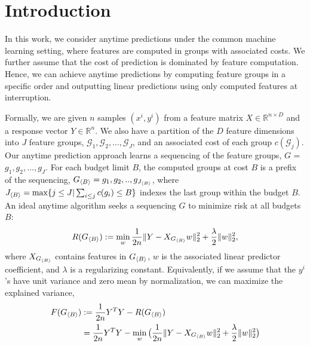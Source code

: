 \section{Introduction}


In this work, we consider anytime predictions under the common 
machine learning setting, where features are computed in groups with associated costs. 
We further assume that the cost of 
prediction is dominated by feature computation. Hence, 
we can achieve anytime predictions by computing feature groups
in a specific order and outputting linear predictions 
using only computed features at interruption.


Formally, we are given $n$ samples $(x^i, y^i)$ from 
a feature matrix $X \in \mathbb{R}^{n \times D}$ and a response vector $Y \in \mathbb{R}^n$. We also have a partition of the
$D$ feature dimensions into $J$ feature groups, 
$\mathcal{G}_1, \mathcal{G}_2, ..., \mathcal{G}_J$, and 
an associated cost of each group $c(\mathcal{G}_j)$. Our anytime prediction approach learns a sequencing of the
feature groups, $G$ = $g_1, g_2,..., g_J$. 
For each budget limit $B$, the computed
groups at cost $B$ is a prefix of the sequencing, $G_{\langle B \rangle} = g_1, g_2,.., g_{J_{\langle B \rangle}}$, 
where 
$J_{\langle B \rangle} = \max \{ j\leq J | \sum _{i\leq j} c(g_i) \leq B \}$ indexes the last group within the budget $B$. 
An ideal anytime algorithm seeks a sequencing $G$ to minimize risk at all budgets $B$:
\begin{align}
\label{eq:risk}
R(G_{\langle B \rangle}) :=   \min _{w}
    \frac{1}{2n} \Vert Y - X_{{G_{\langle B \rangle}}} {w} \Vert_2^2 + \frac{\lambda}{2} \Vert w\Vert_2^2,
\end{align}
where $X_{G_{\langle B \rangle}}$ contains features in $G_{\langle B \rangle}$, $w$ is the associated linear predictor coefficient, and $\lambda$ is a regularizing constant.
Equivalently, if we assume that the $y^i$'s have unit variance and zero mean by normalization, we can maximize the explained variance, 
\begin{align}    
\label{eq:exp-var}
    F(G_{\langle B \rangle}) &:= \frac{1}{2n} Y^TY - R(G_{\langle B \rangle}) \\
     &=  \frac{1}{2n} Y^TY - 
     \min _{w} \big(
    \frac{1}{2n} \Vert Y - X_{{G_{\langle B \rangle}}} {w} \Vert_2^2 + \frac{\lambda}{2} \Vert w\Vert_2^2 \big)
\end{align}

